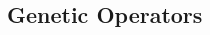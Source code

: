 \documentclass{acm_proc_article-sp}
\begin{document}
\subsection{Genetic Operators}


%


\begin{thebibliography}{1}


\end{thebibliography}


\balancecolumns
\end{document}

